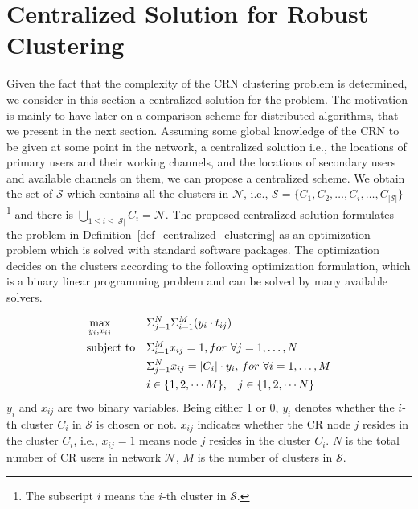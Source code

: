 \documentclass[times]{ettauth}
\newcommand{\ie}{i.e., }
\theoremstyle{mytheoremstyle}
\theoremstyle{mytheoremstyle}
\theoremstyle{mytheoremstyle}
\begin{document}
\section{Centralized Solution for Robust Clustering}
\label{centralized_solution}
Given the fact that the complexity of the CRN clustering problem is determined, we consider in this section a centralized solution for the problem.
The motivation is mainly to have later on a comparison scheme for distributed algorithms, that we present in the next section.
Assuming some global knowledge of the CRN to be given at some point in the network, a centralized solution \ie the locations of primary users and their working channels, and the locations of secondary users and available channels on them, we can propose a centralized scheme.
We obtain the set of $\mathcal{S}$ which contains all the clusters in $\mathcal{N}$, \ie $\mathcal{S}=\{C_1, C_2,\ldots,C_i, \ldots, C_{|\mathcal{S}|}\}$ \footnote{The subscript $i$ means the $i$-th cluster in $\mathcal{S}$.} and there is $\bigcup_{1\leq i \leq |\mathcal{S}|} C_i = \mathcal{N}$.
The proposed centralized solution formulates the problem in Definition~\ref{def_centralized_clustering} as an optimization problem which is solved with standard software packages.
The optimization decides on the clusters according to the following optimization formulation, which is a binary linear programming problem and can be solved by many available solvers.

 

\begin{equation}
\begin{aligned}
     &\max\limits_{y_i, x_{ij}} && \Sigma_{j=1}^N\Sigma_{i=1}^M (y_i\cdot t_{ij}) \\
     &\text{subject to}   && \Sigma_{i=1}^M x_{ij} = 1, for\,\,\forall j=1, \ldots, N \\
   &&& \Sigma_{j=1}^N x_{ij} = |C_i|\cdot y_i,\, for\,\,\forall i=1, \ldots, M \\
   &&& i\in \{1,2, \cdots M\}, \hspace{0.3cm} j\in \{1,2,\cdots N\}
\end{aligned}
\label{centralized_opt}
\end{equation}
$y_i$ and $x_{ij}$ are two binary variables.
Being either 1 or 0, $y_i$ denotes whether the $i$-th cluster $C_i$ in $\mathcal{S}$ is chosen or not.
$x_{ij}$ indicates whether the CR node $j$ resides in the cluster $C_i$, \ie $x_{ij}=1$ means node $j$ resides in the cluster $C_i$. 
$N$ is the total number of CR users in network $\mathcal{N}$, $M$ is the number of clusters in $\mathcal{S}$.
\end{document}
